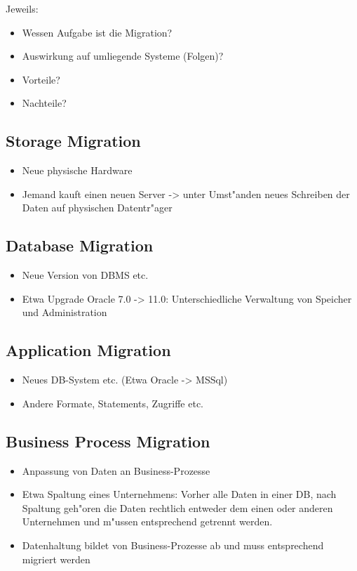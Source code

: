 \documentclass[11pt]{scrartcl}
\begin{document}
Jeweils:
\begin{itemize}
	\item Wessen Aufgabe ist die Migration?
	\item Auswirkung auf umliegende Systeme (Folgen)?
	\item Vorteile?
	\item Nachteile?
\end{itemize}

\subsection{Storage Migration}

\begin{itemize}
	\item Neue physische Hardware
	\item Jemand kauft einen neuen Server -> unter Umst"anden neues Schreiben der Daten auf physischen Datentr"ager
\end{itemize}

\subsection{Database Migration}

\begin{itemize}
	\item Neue Version von DBMS etc.
	\item Etwa Upgrade Oracle 7.0 -> 11.0: Unterschiedliche Verwaltung von Speicher und Administration
\end{itemize}

\subsection{Application Migration}

\begin{itemize}
	\item Neues DB-System etc. (Etwa Oracle -> MSSql)
	\item Andere Formate, Statements, Zugriffe etc.
\end{itemize}

\subsection{Business Process Migration}

\begin{itemize}
	\item Anpassung von Daten an Business-Prozesse
	\item Etwa Spaltung eines Unternehmens: Vorher alle Daten in einer DB, nach Spaltung geh"oren die Daten rechtlich entweder dem einen oder anderen Unternehmen und m"ussen entsprechend getrennt werden.
	\item Datenhaltung bildet von Business-Prozesse ab und muss entsprechend migriert werden
\end{itemize}
\end{document}
